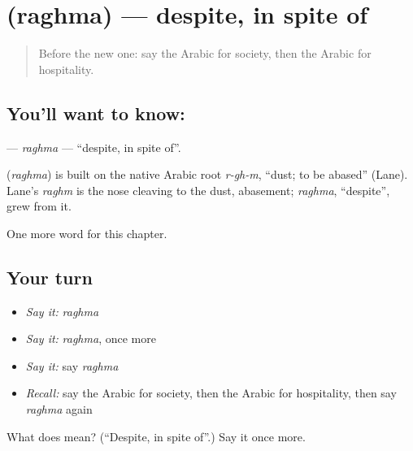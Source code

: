\section[\texorpdfstring{\ar{رغم} (raghma)}{رغم (raghma)}]{ (raghma) — despite, in spite of}

\label{lesson:AR-C175-raghma}



\begin{quote}
Before the new one: say the Arabic for society, then the Arabic for hospitality.
\end{quote}

\subsection*{You'll want to know: }
\textbf{} — \emph{raghma} — \textquotedblleft{}despite, in spite of\textquotedblright{}.

\begin{cousinweb}
\textbf{} (\emph{raghma}) is built on the native Arabic root \emph{r-gh-m}, \textquotedblleft{}dust; to be abased\textquotedblright{} (Lane). Lane's \emph{raghm} is the nose cleaving to the dust, abasement; \emph{raghma}, \textquotedblleft{}despite\textquotedblright{}, grew from it.
\end{cousinweb}

\begin{grammarlens}[title={What you've built}]
One more word for this chapter.
\end{grammarlens}

\subsection*{Your turn}
\begin{itemize}
\raggedright
  \item \emph{Say it:} \emph{raghma}
  \item \emph{Say it:} \emph{raghma}, once more
  \item \emph{Say it:} say \emph{raghma}
  \item \emph{Recall:} say the Arabic for society, then the Arabic for hospitality, then say \emph{raghma} again
\end{itemize}

\begin{tcolorbox}[breakable,colback=teal!4,colframe=teal!35!black,title={Before you move on}]
What does  mean? (\textquotedblleft{}Despite, in spite of\textquotedblright{}.) Say it once more.
\end{tcolorbox}
